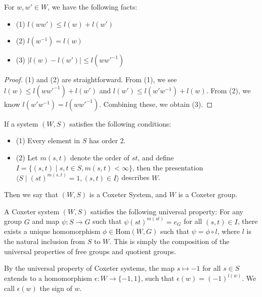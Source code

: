 \documentclass[../main.tex]{subfiles}
\begin{document}
\begin{proposition}
    For \( w, w' \in W \), we have the following facts:
    
    \begin{itemize}
        \item (1) \( l(ww') \le l(w) + l(w') \)
        \item (2) \( l(w^{-1}) = l(w) \)
        \item (3) \( |l(w) - l(w')| \le l(ww'^{-1}) \)
    \end{itemize}
    
    \begin{proof}
        (1) and (2) are straightforward. From (1), we see \( l(w) \le l(ww'^{-1}) + l(w') \) and \( l(w') \le l(w'w^{-1}) + l(w) \). From (2), we know \( l(w'w^{-1}) = l(ww'^{-1}) \). Combining these, we obtain (3).
    \end{proof}
\end{proposition}
    
\begin{definition}
    If a system \( (W, S) \) satisfies the following conditions:
    
    \begin{itemize}
        \item (1) Every element in \( S \) has order 2.
        \item (2) Let \( m(s, t) \) denote the order of \( st \), and define \( I = \{ (s, t) \mid s, t \in S, m(s, t) < \infty \} \), then the presentation \( \langle S \mid (st)^{m(s,t)} = 1, (s,t) \in I \rangle \) describes \( W \).
    \end{itemize}
    
    Then we say that \( (W, S) \) is a Coxeter System, and \( W \) is a Coxeter group.
\end{definition}

\begin{remark}
    A Coxeter system \( (W, S) \) satisfies the following universal property: For any group \( G \) and map \( \psi: S \to G \) such that \( \psi(st)^{m(st)} = e_G \) for all \( (s, t) \in I \), there exists a unique homomorphism \( \phi \in \text{Hom}(W, G) \) such that \( \psi = \phi \circ l \), where \( l \) is the natural inclusion from \( S \) to \( W \). This is simply the composition of the universal properties of free groups and quotient groups.
\end{remark}

\begin{example}
    By the universal property of Coxeter systems, the map \( s \mapsto -1 \) for all \( s \in S \) extends to a homomorphism \( \epsilon: W \to \{-1, 1\} \), such that \( \epsilon(w) = (-1)^{l(w)} \). We call \( \epsilon(w) \) the sign of \( w \).
\end{example}
\end{document}
